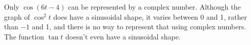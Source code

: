 Only $\cos(6t-4)$ can be represented by a complex
number. Although the graph of $\cos^2t$ does have a sinusoidal shape, it varies
between 0 and 1, rather than $-1$ and 1, and there is no way to represent that
using complex numbers. The function $\tan t$ doesn't even have a sinusoidal shape.
